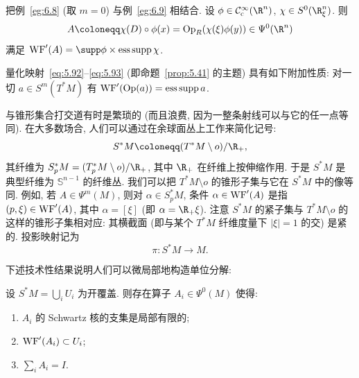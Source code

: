 \begin{example}[微局部化算子]\label{eg:6.10}
把例~\ref{eg:6.8} (取 $m = 0$) 与例~\ref{eg:6.9} 相结合. 设 $\phi \in \SmoothComp(\R^n)$, $\chi \in S^0(\R^n_\xi)$. 则
\begin{equation}\label{eq:6.7}
    A \defeq \chi(D) \circ \phi(x) = \OpR(\chi(\xi)\phi(y)) \in \Psi^0(\R^n)
\end{equation}
满足 $\WF'(A) = \supp \phi \times \esupp \chi$.
\end{example}

\begin{example}[量化]\label{eg:6.11}
量化映射~\eqref{eq:5.92}--\eqref{eq:5.93} (即命题~\ref{prop:5.41} 的主题) 具有如下附加性质: 对一切 $a \in S^m(T^* M)$ 有 $\operatorname{WF}'(\operatorname{Op}(a)) = \operatorname{ess\,supp} a$.
\end{example}

与锥形集合打交道有时是繁琐的 (而且浪费, 因为一整条射线可以与它的任一点等同). 在大多数场合, 人们可以通过在余球面丛上工作来简化记号:
\begin{equation}\label{eq:6.8}
    S^* M \defeq (T^* M \setminus o) / \R_+,
\end{equation}
其纤维为 $S^*_p M = (T^*_p M \setminus o)/\R_+$, 其中 $\R_+$ 在纤维上按伸缩作用. 于是 $S^* M$ 是典型纤维为 $\mathbb{S}^{n-1}$ 的纤维丛. 我们可以把 $T^* M \setminus o$ 的锥形子集与它在 $S^* M$ 中的像等同. 例如, 若 $A \in \Psi^m(M)$, 则对 $\alpha \in S^*_p M$, 条件 $\alpha \in \operatorname{WF}'(A)$ 是指 $(p, \xi) \in \operatorname{WF}'(A)$, 其中 $\alpha = [\xi]$ (即 $\alpha = \R_+ \xi$). 注意 $S^* M$ 的紧子集与 $T^* M \setminus o$ 的这样的锥形子集相对应: 其横截面 (即与某个 $T^* M$ 纤维度量下 $|\xi| = 1$ 的交) 是紧的. 投影映射记为
\begin{equation}\label{eq:6.9}
    \pi \colon S^* M \to M.
\end{equation}

下述技术性结果说明人们可以微局部地构造单位分解:

\begin{lemma}[微局部单位分解]\label{lem:6.12}
设 $S^* M = \bigcup_i U_i$ 为开覆盖. 则存在算子 $A_i \in \Psi^0(M)$ 使得:
\begin{enumerate}
    \item $A_i$ 的 Schwartz 核的支集是局部有限的;
    \item $\operatorname{WF}'(A_i) \subset U_i$;
    \item $\sum_i A_i = I$.
\end{enumerate}
\end{lemma}

